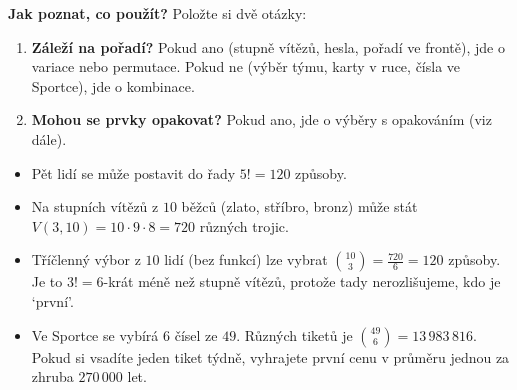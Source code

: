 \begin{definitionbox}
  \textbf{Jak poznat, co použít?} Položte si dvě otázky:
  \begin{enumerate}
    \item \textbf{Záleží na pořadí?} Pokud ano (stupně vítězů, hesla, pořadí ve frontě), jde o variace nebo permutace. Pokud ne (výběr týmu, karty v ruce, čísla ve Sportce), jde o kombinace.
    \item \textbf{Mohou se prvky opakovat?} Pokud ano, jde o výběry s opakováním (viz dále).
  \end{enumerate}
\end{definitionbox}

\begin{example}
  \begin{itemize}
    \item Pět lidí se může postavit do řady $5! = 120$ způsoby.
    \item Na stupních vítězů z $10$ běžců (zlato, stříbro, bronz) může stát $V(3, 10) = 10\cdot 9\cdot 8 = 720$ různých trojic.
    \begin{center}
    \end{center}
    \item Tříčlenný výbor z $10$ lidí (bez funkcí) lze vybrat $\binom{10}{3} = \frac{720}{6} = 120$ způsoby. Je to $3! = 6$-krát méně než stupně vítězů, protože tady nerozlišujeme, kdo je `první'.
    \item Ve Sportce se vybírá $6$ čísel ze $49$. Různých tiketů je $\binom{49}{6} = 13\,983\,816$. Pokud si vsadíte jeden tiket týdně, vyhrajete první cenu v průměru jednou za zhruba $270\,000$ let.
  \end{itemize}
\end{example}

